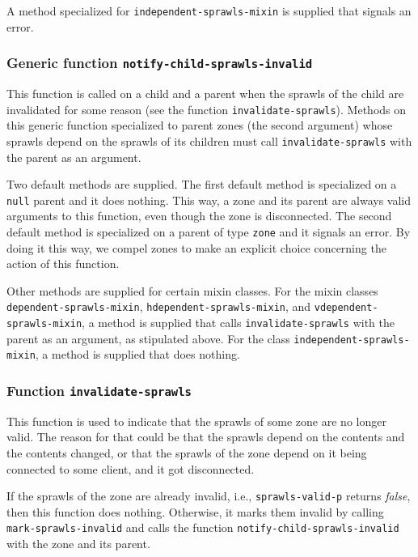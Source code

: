 \documentclass{report}
\begin{document}
A method specialized for \texttt{independent-sprawls-mixin} is supplied
that signals an error.

\subsubsection{Generic function \texttt{notify-child-sprawls-invalid}}
\label{generic-function-notify-child-sprawls-invalid}

This function is called on a child and a parent when the sprawls of the
child are invalidated for some reason (see the function
\texttt{invalidate-sprawls}).  Methods on this generic function
specialized to parent zones (the second argument) whose sprawls depend
on the sprawls of its children must call \texttt{invalidate-sprawls} with
the parent as an argument.

Two default methods are supplied.  The first default method is
specialized on a \texttt{null} parent and it does nothing.  This way,
a zone and its parent are always valid arguments to this function,
even though the zone is disconnected.  The second default method is
specialized on a parent of type \texttt{zone} and it signals an error.
By doing it this way, we compel zones to make an explicit choice
concerning the action of this function.

Other methods are supplied for certain mixin classes.  For the mixin
classes \texttt{dependent-sprawls-mixin},
\texttt{hdependent-sprawls-mixin}, and \texttt{vdependent-sprawls-mixin},
a method is supplied that calls \texttt{invalidate-sprawls} with the
parent as an argument, as stipulated above.  For the class
\texttt{independent-sprawls-mixin}, a method is supplied that does
nothing.

\subsubsection{Function \texttt{invalidate-sprawls}}

This function is used to indicate that the sprawls of some zone are no
longer valid.  The reason for that could be that the sprawls depend on
the contents and the contents changed, or that the sprawls of the zone
depend on it being connected to some client, and it got disconnected.

If the sprawls of the zone are already invalid, i.e.,
\texttt{sprawls-valid-p} returns \emph{false}, then this function does
nothing.  Otherwise, it marks them invalid by calling
\texttt{mark-sprawls-invalid} and calls the function
\texttt{notify-child-sprawls-invalid} with the zone and its parent.
\end{document}
